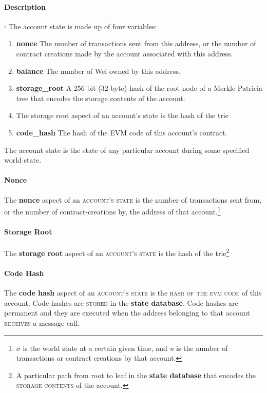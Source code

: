 \documentclass[10pt,a4paper,leqno,bibliography=totoc]{scrartcl}
\newenvironment{alphafootnotes}
{\par\edef\savedfootnotenumber{\number\value{footnote}}
\renewcommand{\thefootnote}{\alph{footnote}}
\setcounter{footnote}{0}}
{\par\setcounter{footnote}{\savedfootnotenumber}}
\begin{document}
\begin{alphafootnotes}
\begin{multicols*}{2}
				\paragraph{Description}: The account state is made up of four variables:
				\begin{enumerate}
					\item \textbf{nonce} The number of transactions sent from this address, or the number of contract creations made by the account associated with this address.
					\item \textbf{balance} The number of Wei owned by this address.
					\item \textbf{storage\_root} A 256-bit (32-byte) hash of the root node of a Merkle Patricia tree that encodes the storage contents of the account.
					\item The storage root aspect of an account’s state is the hash of the trie
					\item \textbf{code\_hash} The hash of the EVM code of this account's contract.
				\end{enumerate}

				The account state is the state of any particular account during some specified world state.

    				\paragraph{Nonce} 
					The \textbf{nonce} aspect of an \textsc{account's state} is the number of transactions sent from, or the number of contract-creations by, the address of that account.\footnote{$\sigma$ is the world state at a certain given time, and \textit{n} is the number of transactions or contract creations by that account.}
    				\paragraph{Storage Root}
    					The \textbf{storage root} aspect of an \textsc{account's state} is the hash of the trie\footnote{A particular path from root to leaf in the \textbf{\gls{state database}} that encodes the \textsc{storage contents} of the account.}
    				\paragraph{Code Hash}
    					The \textbf{code hash} aspect of an \textsc{account's state} is the \textsc{hash of the evm code} of this account. Code hashes are \textsc{stored} in the \textbf{\gls{state database}}. Code hashes are permanent and they are executed when the address belonging to that account \textsc{receives} a message call.

\end{multicols*}
\end{alphafootnotes}
\end{document}
